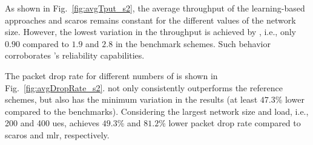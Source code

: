 As shown in Fig.~\ref{fig:avgTput_s2}, the average throughput of the learning-based approaches \name{} and \gls{scaros} remains constant for the different values of the network size. However, the lowest variation in the  throughput is achieved by \name{}, i.e., only $0.90$ compared to $1.9$ and $2.8$ in the benchmark schemes. Such behavior corroborates \name{}'s reliability capabilities. 

The packet drop rate for different numbers of \nodes{} is shown in Fig.~\ref{fig:avgDropRate_s2}. \name{} not only consistently outperforms the reference schemes, but also has the minimum variation in the results (at least $47.3$\% lower compared to the benchmarks). Considering the largest network size and load, i.e., 200 \nodes{} and 400 \glspl{ue}, \name{} achieves $49.3$\% and $81.2$\% lower packet drop rate compared to \gls{scaros} and \gls{mlr}, respectively. 

